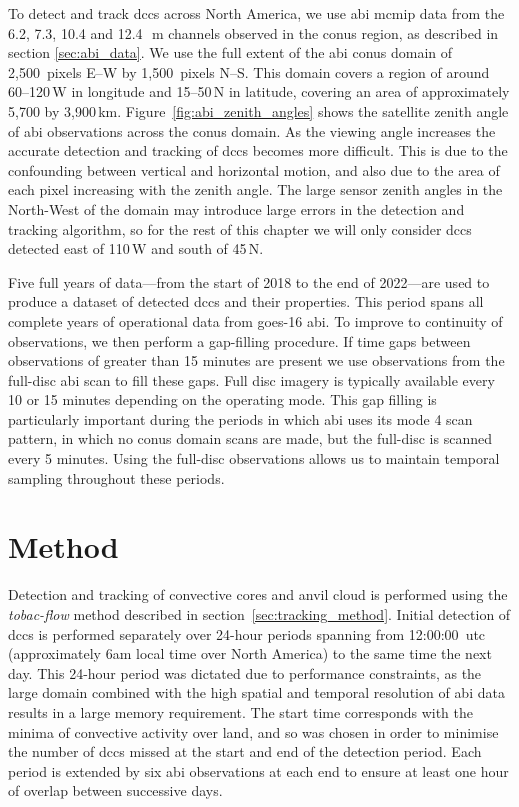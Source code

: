 To detect and track \acrshort{dcc}s across North America, we use \acrshort{abi} \acrshort{mcmip} data from the 6.2, 7.3, 10.4 and 12.4\,\unit{\mu m} channels observed in the \acrshort{conus} region, as described in section \ref{sec:abi_data}.
We use the full extent of the \acrshort{abi} \acrshort{conus} domain of 2,500~pixels E--W by 1,500~pixels N--S.
This domain covers a region of around 60--120\,\textdegree W in longitude and 15--50\,\textdegree N in latitude, covering an area of approximately 5,700 by 3,900\,\unit{km}.
Figure~\ref{fig:abi_zenith_angles} shows the satellite zenith angle of \acrshort{abi} observations across the \acrshort{conus} domain.
As the viewing angle increases the accurate detection and tracking of \acrshort{dcc}s becomes more difficult.
This is due to the confounding between vertical and horizontal motion, and also due to the area of each pixel increasing with the zenith angle.
The large sensor zenith angles in the North-West of the domain may introduce large errors in the detection and tracking algorithm, so for the rest of this chapter we will only consider \acrshort{dcc}s detected east of 110\,\textdegree W and south of 45\,\textdegree N.

Five full years of data---from the start of 2018 to the end of 2022---are used to produce a dataset of detected \acrshort{dcc}s and their properties.
This period spans all complete years of operational data from \acrshort{goes}-16 \acrshort{abi}.
To improve to continuity of observations, we then perform a gap-filling procedure.
If time gaps between observations of greater than 15 minutes are present we use observations from the full-disc \acrshort{abi} scan to fill these gaps.
Full disc imagery is typically available every 10 or 15 minutes depending on the operating mode.
This gap filling is particularly important during the periods in which \acrshort{abi} uses its mode 4 scan pattern, in which no \acrshort{conus} domain scans are made, but the full-disc is scanned every 5 minutes.
Using the full-disc observations allows us to maintain temporal sampling throughout these periods.


\section{Method} \label{sec:conus_method}

Detection and tracking of convective cores and anvil cloud is performed using the \textit{tobac-flow} method \citep{jones_semi-lagrangian_2023} described in section~\ref{sec:tracking_method}.
Initial detection of \acrshort{dcc}s is performed separately over 24-hour periods spanning from 12:00:00~\acrshort{utc} (approximately 6am local time over North America) to the same time the next day.
This 24-hour period was dictated due to performance constraints, as the large domain combined with the high spatial and temporal resolution of \acrshort{abi} data results in a large memory requirement.
The start time corresponds with the minima of convective activity over land, and so was chosen in order to minimise the number of \acrshort{dcc}s missed at the start and end of the detection period.
Each period is extended by six \acrshort{abi} observations at each end to ensure at least one hour of overlap between successive days.

